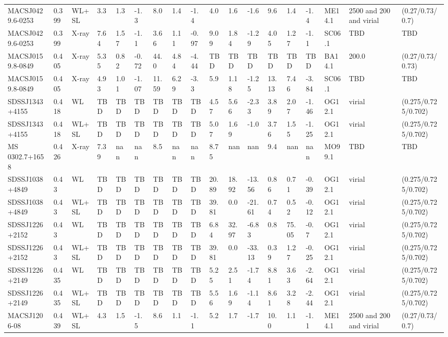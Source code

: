 \documentclass{article}
\begin{document}
\begin{center}
\begin{landscape}
\begin{longtable}{llllllllllllllllll}
MACSJ0429.6-0253 & 0.399 & WL+SL & 3.3 & 1.3 & -1.3 & 8.0 & 1.4 & -1.4 & 4.0 & 1.6 & -1.6 & 9.6 & 1.4 & -1.4 & ME14.1 & 2500 and 200 and virial & (0.27/0.73/0.7) \\
MACSJ0429.6-0253 & 0.399 & X-ray & 7.64 & 1.57 & -1.1 & 3.66 & 1.11 & -0.97 & 9.09 & 1.84 & -1.29 & 4.05 & 1.27 & -1.1 & SC06.1 & TBD & TBD \\
MACSJ0159.8-0849 & 0.405 & X-ray & 5.35 & 0.82 & -0.72 & 44.0 & 4.84 & -4.44 & TBD & TBD & TBD & TBD & TBD & TBD & BA14.1 & 200.0 & (0.27/0.73/0.73) \\
MACSJ0159.8-0849 & 0.405 & X-ray & 4.93 & 1.01 & -1.07 & 11.59 & 6.29 & -3.3 & 5.9 & 1.18 & -1.25 & 13.13 & 7.46 & -3.84 & SC06.1 & TBD & TBD \\
SDSSJ1343+4155 & 0.418 & WL & TBD & TBD & TBD & TBD & TBD & TBD & 4.57 & 5.66 & -2.33 & 3.89 & 2.07 & -1.46 & OG12.1 & virial & (0.275/0.725/0.702) \\
SDSSJ1343+4155 & 0.418 & WL+SL & TBD & TBD & TBD & TBD & TBD & TBD & 5.07 & 1.69 & -1.0 & 3.76 & 1.55 & -1.25 & OG12.1 & virial & (0.275/0.725/0.702) \\
MS 0302.7+1658 & 0.426 & X-ray & 7.39 & nan & nan & 8.5 & nan & nan & 8.75 & nan & nan & 9.4 & nan & nan & MO99.1 & TBD & TBD \\
SDSSJ1038+4849 & 0.43 & WL & TBD & TBD & TBD & TBD & TBD & TBD & 20.89 & 18.92 & -13.56 & 0.86 & 0.71 & -0.39 & OG12.1 & virial & (0.275/0.725/0.702) \\
SDSSJ1038+4849 & 0.43 & WL+SL & TBD & TBD & TBD & TBD & TBD & TBD & 39.81 & 0.0 & -21.61 & 0.74 & 0.52 & -0.12 & OG12.1 & virial & (0.275/0.725/0.702) \\
SDSSJ1226+2152 & 0.43 & WL & TBD & TBD & TBD & TBD & TBD & TBD & 6.84 & 32.97 & -6.83 & 0.8 & 75.05 & -0.7 & OG12.1 & virial & (0.275/0.725/0.702) \\
SDSSJ1226+2152 & 0.43 & WL+SL & TBD & TBD & TBD & TBD & TBD & TBD & 39.81 & 0.0 & -33.13 & 0.39 & 1.27 & -0.25 & OG12.1 & virial & (0.275/0.725/0.702) \\
SDSSJ1226+2149 & 0.435 & WL & TBD & TBD & TBD & TBD & TBD & TBD & 5.25 & 2.51 & -1.74 & 8.81 & 3.63 & -2.64 & OG12.1 & virial & (0.275/0.725/0.702) \\
SDSSJ1226+2149 & 0.435 & WL+SL & TBD & TBD & TBD & TBD & TBD & TBD & 5.56 & 1.69 & -1.14 & 8.61 & 3.28 & -2.44 & OG12.1 & virial & (0.275/0.725/0.702) \\
MACSJ1206-08 & 0.439 & WL+SL & 4.3 & 1.5 & -1.5 & 8.6 & 1.1 & -1.1 & 5.2 & 1.7 & -1.7 & 10.0 & 1.1 & -1.1 & ME14.1 & 2500 and 200 and virial & (0.27/0.73/0.7) \\

\end{longtable}
\end{landscape}
\end{center}
\end{document}
